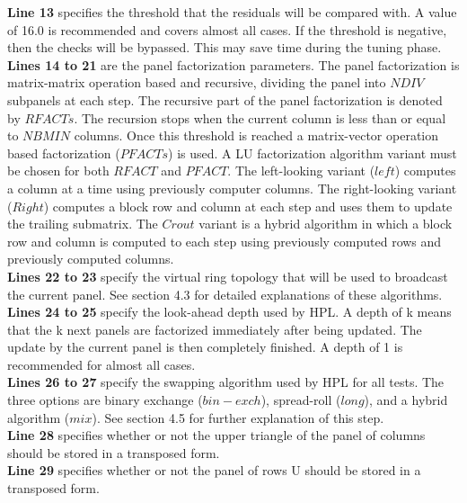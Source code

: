 \documentclass[a4paper, 11pt]{article}
\begin{document}
	\noindent\textbf{\large Line 13} specifies the threshold that the residuals will be compared with. A value of 16.0 is recommended and covers almost all cases. If the threshold is negative, then the checks will be bypassed. This may save time during the tuning phase. \\
	
	\noindent\textbf{\large Lines 14 to 21} are the panel factorization parameters. The panel factorization is matrix-matrix operation based and recursive, dividing the panel into $NDIV$ subpanels at each step. The recursive part of the panel factorization is denoted by $RFACTs$. The recursion stops when the current column is less than or equal to $NBMIN$ columns. Once this threshold is reached a matrix-vector operation based factorization ($PFACTs$) is used. A LU factorization algorithm variant must be chosen for both $RFACT$ and $PFACT$. The left-looking variant ($left$) computes a column at a time using previously computer columns. The right-looking variant ($Right$) computes a block row and column at each step and uses them to update the trailing submatrix. The $Crout$ variant is a hybrid algorithm in which a block row and column is computed to each step using previously computed rows and previously computed columns. \\
	
	\noindent\textbf{\large Lines 22 to 23} specify the virtual ring topology that will be used to broadcast the current panel. See section 4.3 for detailed explanations of these algorithms. \\
	
	\noindent\textbf{\large Lines 24 to 25} specify the look-ahead depth used by HPL. A depth of k means that the k next panels are factorized immediately after being updated. The update by the current panel is then completely finished. A depth of 1 is recommended for almost all cases. \\
	
	\noindent\textbf{\large Lines 26 to 27} specify the swapping algorithm used by HPL for all tests. The three options are binary exchange ($bin-exch$), spread-roll ($long$), and a hybrid algorithm ($mix$). See section 4.5 for further explanation of this step. \\
	
	\noindent\textbf{\large Line 28} specifies whether or not the upper triangle of the panel of columns should be stored in a transposed form. \\
	
	\noindent\textbf{\large Line 29} specifies whether or not the panel of rows U should be stored in a transposed form. \\
	
\end{document}
